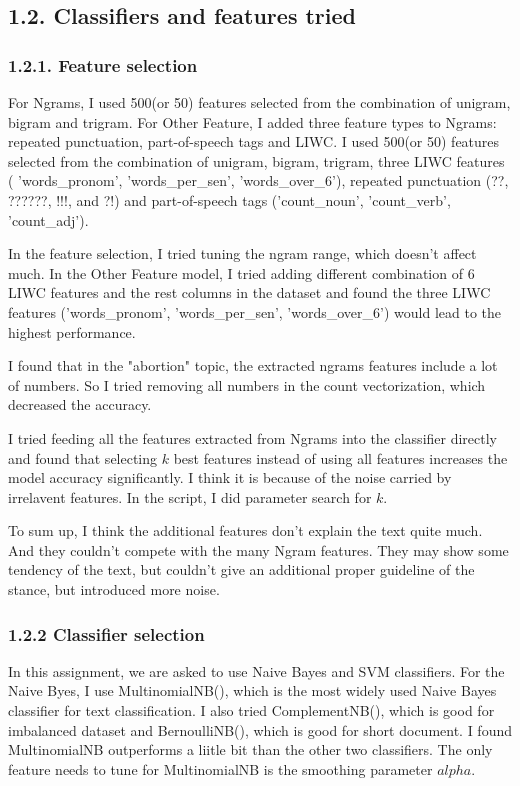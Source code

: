 \documentclass{article}
\begin{document}
\subsection*{1.2. Classifiers and features tried}
\subsubsection*{1.2.1. Feature selection}
For Ngrams, I used 500(or 50) features selected from the combination of unigram, bigram and trigram. For Other Feature, I added three feature types to Ngrams: repeated punctuation, part-of-speech tags and LIWC. I used 500(or 50) features selected from the combination of unigram, bigram, trigram, three LIWC features ( 'words\_pronom', 'words\_per\_sen', 'words\_over\_6'), repeated punctuation (??, ??????, !!!, and ?!) and part-of-speech tags ('count\_noun', 'count\_verb', 'count\_adj').

In the feature selection, I tried tuning the ngram range, which doesn't affect much. In the Other Feature model, I tried adding different combination of 6 LIWC features and the rest columns in the dataset and found the three LIWC features ('words\_pronom', 'words\_per\_sen', 'words\_over\_6') would lead to the highest performance.

I found that in the "abortion" topic, the extracted ngrams features include a lot of numbers. So I tried removing all numbers in the count vectorization, which decreased the accuracy. 

I tried feeding all the features extracted from Ngrams into the classifier directly and found that selecting $k$ best features instead of using all features increases the model accuracy significantly. I think it is because of the noise carried by irrelavent  features. In the script, I did parameter search for $k$.

To sum up, I think the additional features don't explain the text quite much. And they couldn't compete with the many Ngram features. They may show some tendency of the text, but couldn't give an additional proper guideline of the stance, but introduced more noise.


\subsubsection*{1.2.2 Classifier selection}
In this assignment, we are asked to use Naive Bayes and SVM classifiers. For the Naive Byes, I use MultinomialNB(), which is the most widely used Naive Bayes classifier for text classification. I also tried ComplementNB(), which is good for imbalanced dataset and BernoulliNB(), which is good for short document. I found MultinomialNB outperforms a liitle bit than the other two classifiers. The only feature needs to tune for MultinomialNB is the smoothing parameter $alpha$.
\end{document}
